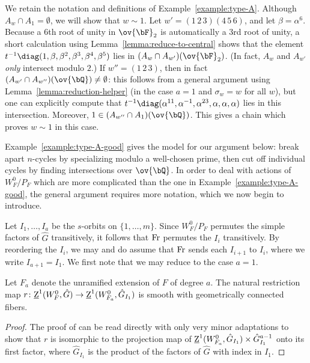 \begin{example}\label{example:type-A-good}
    We retain the notation and definitions of Example~\ref{example:type-A}. Although $A_w \cap A_1 = \emptyset$, we will show that $w \sim 1$. Let $w' = (1 \, 2 \, 3)(4 \, 5 \, 6)$, and let $\beta = \alpha^6$. Because a 6th root of unity in $\ov{\bF}_2$ is automatically a 3rd root of unity, a short calculation using Lemma~\ref{lemma:reduce-to-central} shows that the element $t^{-1}\diag(1, \beta, \beta^2, \beta^3, \beta^4, \beta^5)$ lies in $(A_w \cap A_{w'})(\ov{\bF}_2)$. (In fact, $A_w$ and $A_{w'}$ \textit{only} intersect modulo $2$.) If $w'' = (1 \, 2\, 3)$, then in fact $(A_{w'} \cap A_{w''})(\ov{\bQ}) \neq \emptyset$: this follows from a general argument using Lemma~\ref{lemma:reduction-helper} (in the case $a = 1$ and $\sigma_{w} = w$ for all $w$), but one can explicitly compute that $t^{-1}\diag(\alpha^{11}, \alpha^{-1}, \alpha^{23}, \alpha, \alpha, \alpha)$ lies in this intersection. Moreover, $1 \in (A_{w''} \cap A_1)(\ov{\bQ})$. This gives a chain which proves $w \sim 1$ in this case.
\end{example}

Example~\ref{example:type-A-good} gives the model for our argument below: break apart $n$-cycles by specializing modulo a well-chosen prime, then cut off individual cycles by finding intersections over $\ov{\bQ}$. In order to deal with actions of $W_F^0/P_F$ which are more complicated than the one in Example~\ref{example:type-A-good}, the general argument requires more notation, which we now begin to introduce.\smallskip

Let $I_1, \dots, I_a$ be the $s$-orbits on $\{1, \dots, m\}$. Since $W_F^0/P_F$ permutes the simple factors of $\hat{G}$ transitively, it follows that $\rm{Fr}$ permutes the $I_i$ transitively. By reordering the $I_i$, we may and do assume that $\rm{Fr}$ sends each $I_{i+1}$ to $I_i$, where we write $I_{a + 1} = I_1$. We first note that we may reduce to the case $a = 1$.

\begin{lemma}\label{lemma:shapiro}
    Let $F_a$ denote the unramified extension of $F$ of degree $a$. The natural restriction map $r\colon \underline{\rm{Z}}^1(W_F^0, \hat{G}) \to \underline{\rm{Z}}^1(W_{F_a}^0, \hat{G}_{I_1})$ is smooth with geometrically connected fibers.
\end{lemma}

\begin{proof}
    The proof of \cite[5.13]{DHKM} can be read directly with only very minor adaptations to show that $r$ is isomorphic to the projection map of $\underline{\rm{Z}}^1(W_{F_a}^0, \hat{G}_{I_1}) \times \hat{G}_{I_1}^{a-1}$ onto its first factor, where $\hat{G}_{I_1}$ is the product of the factors of $\hat{G}$ with index in $I_1$.
\end{proof}

